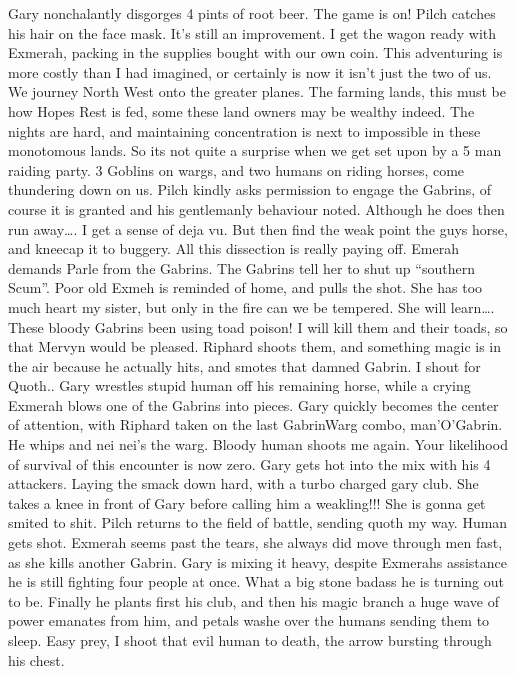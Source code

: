 Gary nonchalantly disgorges 4 pints of root beer. The game is on! Pilch catches his hair on the face mask. It’s still an improvement.\medskip
I get the wagon ready with Exmerah, packing in the supplies bought with our own coin. This adventuring is more costly than I had imagined, or certainly is now it isn’t just the two of us.\medskip
We journey North West onto the greater planes. The farming lands, this must be how Hopes Rest is fed, some these land owners may be wealthy indeed. The nights are hard, and maintaining concentration is next to impossible in these monotomous lands. So its not quite a surprise when we get set upon by a 5 man raiding party. 3 Goblins on wargs, and two humans on riding horses, come thundering down on us.\medskip
Pilch kindly asks permission to engage the Gabrins, of course it is granted and his gentlemanly behaviour noted. Although he does then run away…. I get a sense of deja vu. But then find the weak point the guys horse, and kneecap it to buggery. All this dissection is really paying off.\medskip
Emerah demands Parle from the Gabrins. The Gabrins tell her to shut up “southern Scum”. Poor old Exmeh is reminded of home, and pulls the shot. She has too much heart my sister, but only in the fire can we be tempered. She will learn….\medskip
These bloody Gabrins been using toad poison! I will kill them and their toads, so that Mervyn would be pleased. Riphard shoots them, and something magic is in the air because he actually hits, and smotes that damned Gabrin. I shout for Quoth..\medskip
Gary wrestles stupid human off his remaining horse, while a crying Exmerah blows one of the Gabrins into pieces. Gary quickly becomes the center of attention, with Riphard taken on the last GabrinWarg combo, man’O’Gabrin. He whips and nei nei’s the warg.\medskip
Bloody human shoots me again. Your likelihood of survival of this encounter is now zero.\medskip
Gary gets hot into the mix with his 4 attackers. Laying the smack down hard, with a turbo charged gary club. She takes a knee in front of Gary before calling him a weakling!!! She is gonna get smited to shit.\medskip
Pilch returns to the field of battle, sending quoth my way. Human gets shot. Exmerah seems past the tears, she always did move through men fast, as she kills another Gabrin.\medskip
Gary is mixing it heavy, despite Exmerahs assistance he is still fighting four people at once. What a big stone badass he is turning out to be. Finally he plants first his club, and then his magic branch a huge wave of power emanates from him, and petals washe over the humans sending them to sleep. Easy prey, I shoot that evil human to death, the arrow bursting through his chest.\medskip
